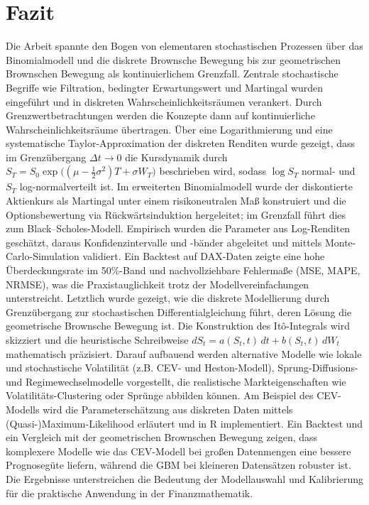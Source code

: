 \newpage

\section{Fazit}

Die Arbeit spannte den Bogen von elementaren stochastischen Prozessen über das Binomialmodell und die diskrete Brownsche 
Bewegung bis zur geometrischen Brownschen Bewegung als kontinuierlichem Grenzfall. Zentrale stochastische Begriffe wie 
Filtration, bedingter Erwartungswert und Martingal wurden eingeführt und in diskreten Wahrscheinlichkeitsräumen verankert. 
Durch Grenzwertbetrachtungen werden die Konzepte dann auf kontinuierliche Wahrscheinlichkeitsräume übertragen. Über eine 
Logarithmierung und eine systematische Taylor-Approximation der diskreten Renditen wurde gezeigt, dass im Grenzübergang 
$\Delta t \to 0$ die Kursdynamik durch
$S_T = S_0 \exp\!\big((\mu - \tfrac12\sigma^2)T + \sigma W_T\big)$
beschrieben wird, sodass $\log S_T$ normal- und $S_T$ log-normalverteilt ist. Im erweiterten Binomialmodell 
wurde der diskontierte Aktienkurs als Martingal unter einem risikoneutralen Maß konstruiert und die Optionsbewertung 
via Rückwärtsinduktion hergeleitet; im Grenzfall führt dies zum Black–Scholes-Modell. Empirisch wurden die Parameter aus 
Log-Renditen geschätzt, daraus Konfidenzintervalle und -bänder abgeleitet und mittels Monte-Carlo-Simulation validiert. 
Ein Backtest auf DAX-Daten zeigte eine hohe Überdeckungsrate im 50\%-Band und nachvollziehbare Fehlermaße (MSE, MAPE, NRMSE), 
was die Praxistauglichkeit trotz der Modellvereinfachungen unterstreicht. Letztlich wurde gezeigt,
wie die diskrete Modellierung durch Grenzübergang zur stochastischen Differentialgleichung führt, deren Lösung die geometrische Brownsche Bewegung ist. Die Konstruktion des Itô-Integrals wird skizziert und die heuristische Schreibweise $dS_t = a(S_t,t)\,dt + b(S_t,t)\,dW_t$ mathematisch präzisiert. 
Darauf aufbauend werden alternative Modelle wie lokale und stochastische Volatilität (z.B. CEV- und Heston-Modell), Sprung-Diffusions- und Regimewechselmodelle vorgestellt, die realistische Markteigenschaften wie Volatilitäts-Clustering oder Sprünge abbilden können. 
Am Beispiel des CEV-Modells wird die Parameterschätzung aus diskreten Daten mittels (Quasi-)Maximum-Likelihood erläutert und in R implementiert. Ein Backtest und ein Vergleich mit der geometrischen Brownschen Bewegung zeigen, dass komplexere Modelle wie das CEV-Modell bei großen Datenmengen eine bessere Prognosegüte liefern, während die GBM bei kleineren Datensätzen robuster ist. Die Ergebnisse unterstreichen die Bedeutung der Modellauswahl und Kalibrierung für die praktische Anwendung in der Finanzmathematik.



